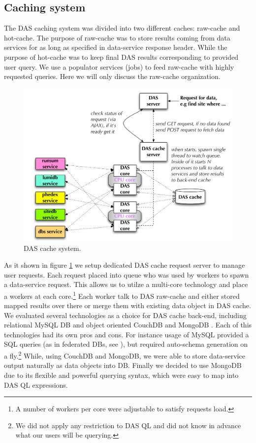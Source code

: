 \documentclass[a4paper]{jpconf}
\begin{document}
\subsection{Caching system}
The DAS caching system was divided into two different caches: raw-cache and hot-cache.
The purpose of raw-cache was to store results coming from data services for
as long as specified in data-service response header. While the purpose of hot-cache
was to keep final DAS results corresponding to provided user query. We use a populator
services (jobs) to feed raw-cache with highly requested queries. Here we will only
discuss the raw-cache organization. 
\begin{figure}[htb]
\centering
\includegraphics[width=150mm]{DAS_cache.pdf}
\caption{
DAS cache system.
}
\label{DAS_cache}
\end{figure}
As it shown in figure \ref{DAS_cache} we setup
dedicated DAS cache request server to manage user requests. Each request placed into
queue who was used by workers to spawn a data-service request. 
This allows us to utilze a multi-core technology and place a workers at each 
core.\footnote{A number of workers per core were adjustable to satisfy requests load.}
Each worker talk to DAS raw-cache and either stored mapped results over there or merge
them with existing data object in DAS cache. We evaluated several technologies
as a choice for DAS cache back-end, including relational MySQL DB \cite{MySQL} 
and object oriented CouchDB \cite{CouchDB} and MongoDB \cite{MongoDB}.
Each of this technologies had its own pros and cons. For instance usage
of MySQL provided a SQL queries (as in federated DBs, see \cite{FedDB}), but
required auto-schema generation on a fly.\footnote{We did not apply any
restriction to DAS QL and did not know in advance what our users will be
querying.} While, using CouchDB and MongoDB, we were able to store
data-service output naturally as data objects into DB. Finally we decided
to use MongoDB due to its flexible and
powerful querying syntax, which were easy to map into DAS QL expressions. 
\end{document}
